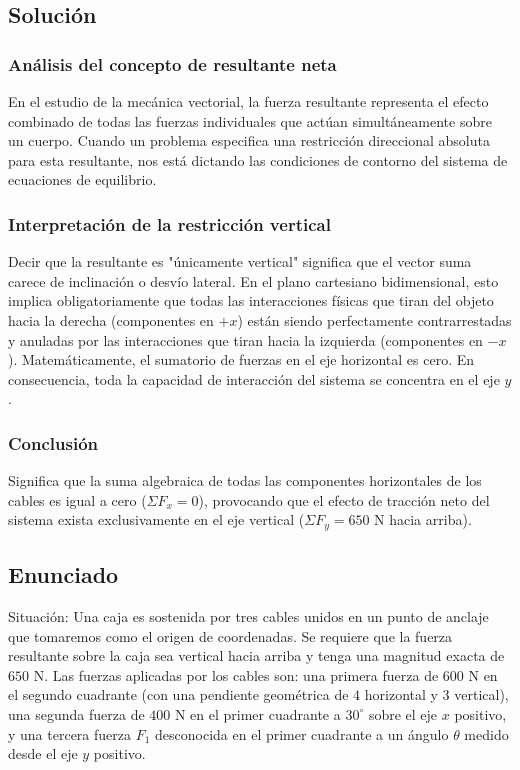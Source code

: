 \documentclass[12pt, a4paper]{article}
\begin{document}
\subsection*{Solución}

\subsubsection*{Análisis del concepto de resultante neta}
En el estudio de la mecánica vectorial, la fuerza resultante representa el efecto combinado de todas las fuerzas individuales que actúan simultáneamente sobre un cuerpo. Cuando un problema especifica una restricción direccional absoluta para esta resultante, nos está dictando las condiciones de contorno del sistema de ecuaciones de equilibrio.

\subsubsection*{Interpretación de la restricción vertical}
Decir que la resultante es "únicamente vertical" significa que el vector suma carece de inclinación o desvío lateral. En el plano cartesiano bidimensional, esto implica obligatoriamente que todas las interacciones físicas que tiran del objeto hacia la derecha (componentes en $+x$) están siendo perfectamente contrarrestadas y anuladas por las interacciones que tiran hacia la izquierda (componentes en $-x$). Matemáticamente, el sumatorio de fuerzas en el eje horizontal es cero. En consecuencia, toda la capacidad de interacción del sistema se concentra en el eje $y$.

\subsubsection*{Conclusión}
Significa que la suma algebraica de todas las componentes horizontales de los cables es igual a cero ($\Sigma F_x = 0$), provocando que el efecto de tracción neto del sistema exista exclusivamente en el eje vertical ($\Sigma F_y = 650 \text{ N}$ hacia arriba).

\newpage
\subsection*{Enunciado}
Situación: Una caja es sostenida por tres cables unidos en un punto de anclaje que tomaremos como el origen de coordenadas. Se requiere que la fuerza resultante sobre la caja sea vertical hacia arriba y tenga una magnitud exacta de $650 \text{ N}$. Las fuerzas aplicadas por los cables son: una primera fuerza de $600 \text{ N}$ en el segundo cuadrante (con una pendiente geométrica de $4$ horizontal y $3$ vertical), una segunda fuerza de $400 \text{ N}$ en el primer cuadrante a $30^\circ$ sobre el eje $x$ positivo, y una tercera fuerza $F_1$ desconocida en el primer cuadrante a un ángulo $\theta$ medido desde el eje $y$ positivo.
\end{document}
